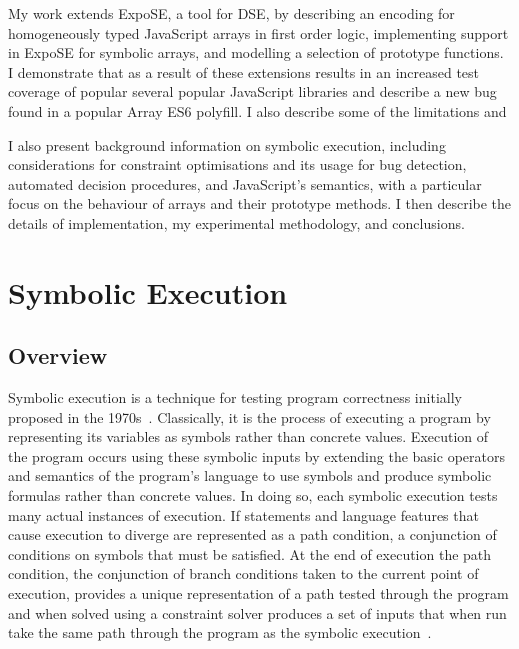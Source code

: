 \documentclass[]{final_report}
\begin{document}
My work extends ExpoSE, a tool for DSE, by describing an encoding for homogeneously typed JavaScript arrays in first order logic, implementing support in ExpoSE for symbolic arrays, and modelling a selection of prototype functions. I demonstrate that as a result of these extensions results in an increased test coverage of popular several popular JavaScript libraries and describe a new bug found in a popular Array ES6 polyfill. I also describe some of the limitations and 

I also present background information on symbolic execution, including considerations for constraint optimisations and its usage for bug detection, automated decision procedures, and JavaScript's semantics, with a particular focus on the behaviour of arrays and their prototype methods. I then describe the details of implementation, my experimental methodology, and conclusions.

\chapter{Symbolic Execution}

\section{Overview}

Symbolic execution is a technique for testing program correctness initially proposed in the 1970s~\cite{king1976symbolic, boyer1975select}. Classically, it is the process of executing a program by representing its variables as symbols rather than concrete values. Execution of the program occurs using these symbolic inputs by extending the basic operators and semantics of the program's language to use symbols and produce symbolic formulas rather than concrete values. In doing so, each symbolic execution tests many actual instances of execution. If statements and language features that cause execution to diverge are represented as a path condition, a conjunction of conditions on symbols that must be satisfied. At the end of execution the path condition, the conjunction of branch conditions taken to the current point of execution, provides a unique representation of a path tested through the program and when solved using a constraint solver produces a set of inputs that when run take the same path through the program as the symbolic execution~\cite{godefroid2008automated, godefroid2005dart}.
\end{document}
